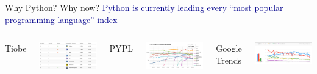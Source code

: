 \documentclass[aspectratio=169]{beamer}
\begin{document}
\begin{frame}{Why Python? Why now?}
\large
\vspace{0.25 cm}
\textcolor{darkblue}{\mbox{\hspace{-0.5 cm}}Python is currently leading every ``most popular programming language'' index}

\vspace{0.25 cm}
\begin{columns}[t]
\centering Tiobe

\vspace{0.1 cm}
\includegraphics[width=\linewidth]{python-rankings-tiobe-2022.png}

\centering PYPL

\vspace{0.1 cm}
\includegraphics[width=\linewidth]{python-rankings-pypl-2022.png}

\centering Google Trends

\vspace{0.1 cm}
\includegraphics[width=\linewidth]{python-rankings-googletrends-2022.png}
\end{columns}


\end{frame}
\end{document}
